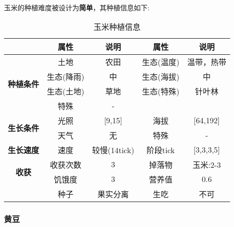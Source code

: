 玉米的种植难度被设计为\textbf{简单}，其种植信息如下:

\begin{table}[H]
    \centering
    \caption{玉米种植信息}
    \label{table:玉米种植信息}
    \setlength{\tabcolsep}{4mm}
    \begin{tabular}{c|cc|cc}
        \toprule
                                           & \textbf{属性} & \textbf{说明} & \textbf{属性} & \textbf{说明} \\
        \midrule
        \multirow{4}{*}{\textbf{种植条件}} & 土地          & 农田          & 生态(温度)    & 温带，热带    \\
                                           & 生态(降雨)    & 中            & 生态(海拔)    & 中            \\
                                           & 生态(土地)    & 草地          & 生态(特殊)    & 针叶林        \\
                                           & 特殊          & -                                             \\
        \midrule
        \multirow{2}{*}{\textbf{生长条件}} & 光照          & [9,15]        & 海拔          & [64,192]      \\
                                           & 天气          & 无            & 特殊          & -             \\
        \midrule
        \textbf{生长速度}                  & 速度          & 较慢(14tick)  & 阶段tick      & [3,3,3,5]     \\
        \midrule
        \multirow{2}{*}{\textbf{收获}}     & 收获次数      & 3             & 掉落物        & 玉米:2-3      \\
                                           & 饥饿度        & 3             & 营养值        & 0.6           \\
                                           & 种子          & 果实分离      & 生吃          & 不可          \\
        \bottomrule
    \end{tabular}
\end{table}

\subsubsection{黄豆}

